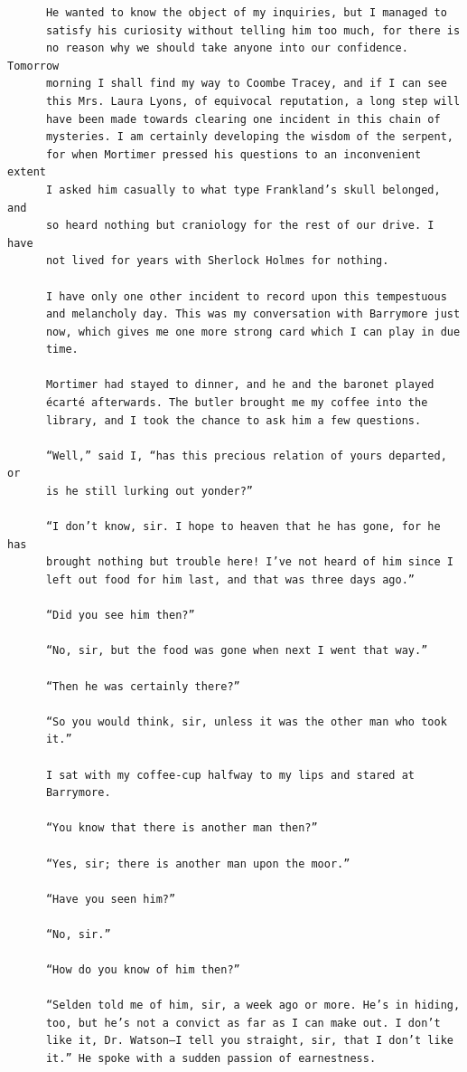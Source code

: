 \documentclass{article}
\begin{document}
\begin{verbatim}
      He wanted to know the object of my inquiries, but I managed to
      satisfy his curiosity without telling him too much, for there is
      no reason why we should take anyone into our confidence. Tomorrow
      morning I shall find my way to Coombe Tracey, and if I can see
      this Mrs. Laura Lyons, of equivocal reputation, a long step will
      have been made towards clearing one incident in this chain of
      mysteries. I am certainly developing the wisdom of the serpent,
      for when Mortimer pressed his questions to an inconvenient extent
      I asked him casually to what type Frankland’s skull belonged, and
      so heard nothing but craniology for the rest of our drive. I have
      not lived for years with Sherlock Holmes for nothing.

      I have only one other incident to record upon this tempestuous
      and melancholy day. This was my conversation with Barrymore just
      now, which gives me one more strong card which I can play in due
      time.

      Mortimer had stayed to dinner, and he and the baronet played
      écarté afterwards. The butler brought me my coffee into the
      library, and I took the chance to ask him a few questions.

      “Well,” said I, “has this precious relation of yours departed, or
      is he still lurking out yonder?”

      “I don’t know, sir. I hope to heaven that he has gone, for he has
      brought nothing but trouble here! I’ve not heard of him since I
      left out food for him last, and that was three days ago.”

      “Did you see him then?”

      “No, sir, but the food was gone when next I went that way.”

      “Then he was certainly there?”

      “So you would think, sir, unless it was the other man who took
      it.”

      I sat with my coffee-cup halfway to my lips and stared at
      Barrymore.

      “You know that there is another man then?”

      “Yes, sir; there is another man upon the moor.”

      “Have you seen him?”

      “No, sir.”

      “How do you know of him then?”

      “Selden told me of him, sir, a week ago or more. He’s in hiding,
      too, but he’s not a convict as far as I can make out. I don’t
      like it, Dr. Watson—I tell you straight, sir, that I don’t like
      it.” He spoke with a sudden passion of earnestness.


\end{verbatim}
\end{document}
